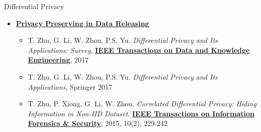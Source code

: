 \documentclass[
 size=14pt,
 paper=smartboard,  %
 mode=present, 		%
 display=slides, 	%
 style=tuliplab,  	%
 pauseslide,
 fleqn,leqno]{powerdot}{}
\begin{document}
\begin{slide}[toc=,bm=]{Differential Privacy}

{
\begin{itemize}
	\item
	\textbf{\underline{Privacy Preserving in Data Releasing}}
	\begin{itemize}
		\item
		T. Zhu, G. Li, W. Zhou, P.S. Yu.
		\textit{Differential Privacy and Its Applications: Survey},
		\textbf{\uline{IEEE Transactions on Data and Knowledge Engineering}}, 2017
		\item
		T. Zhu, G. Li, W. Zhou, P.S. Yu.
		\textit{Differential Privacy and Its Applications}, Springer 2017
		\item
		T. Zhu, P. Xiong, G. Li, W. Zhou.
		\textit{Correlated Differential Privacy: Hiding Information in Non-IID Dataset}.
		\textbf{\uline{IEEE Transactions on Information Forensics \& Security}}, 2015, 10(2), 229-242
	\end{itemize}
\end{itemize}
}

\end{slide}
\end{document}
